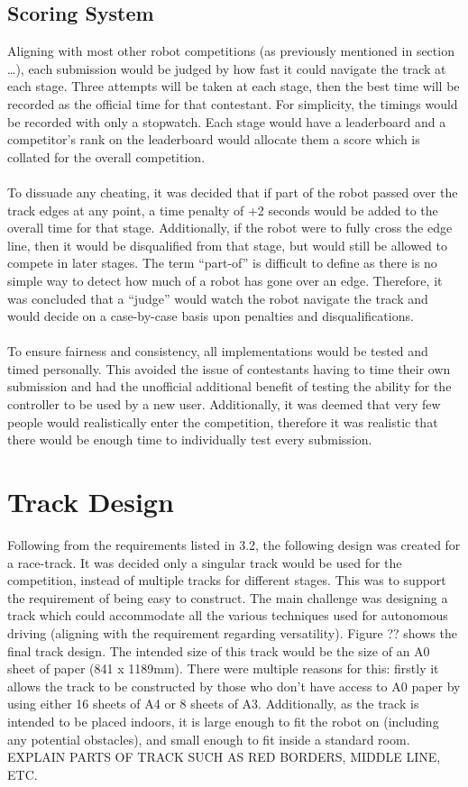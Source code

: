\documentclass{l4proj}
\begin{document}
\subsection{Scoring System}
Aligning with most other robot competitions (as previously mentioned in section …), each submission would be judged by how fast it could navigate the track at each stage. Three attempts will be taken at each stage, then the best time will be recorded as the official time for that contestant. For simplicity, the timings would be recorded with only a stopwatch. Each stage would have a leaderboard and a competitor's rank on the leaderboard would allocate them a score which is collated for the overall competition.
\\\\
To dissuade any cheating, it was decided that if part of the robot passed over the track edges at any point, a time penalty of +2 seconds would be added to the overall time for that stage. Additionally, if the robot were to fully cross the edge line, then it would be disqualified from that stage, but would still be allowed to compete in later stages. The term “part-of” is difficult to define as there is no simple way to detect how much of a robot has gone over an edge. Therefore, it was concluded that a “judge” would watch the robot navigate the track and would decide on a case-by-case basis upon penalties and disqualifications.
\\\\
To ensure fairness and consistency, all implementations would be tested and timed personally. This avoided the issue of contestants having to time their own submission and had the unofficial additional benefit of testing the ability for the controller to be used by a new user. Additionally, it was deemed that very few people would realistically enter the competition, therefore it was realistic that there would be enough time to individually test every submission.

\section{Track Design}
Following from the requirements listed in 3.2, the following design was created for a race-track. It was decided only a singular track would be used for the competition, instead of multiple tracks for different stages. This was to support the requirement of being easy to construct. The main challenge was designing a track which could accommodate all the various techniques used for autonomous driving (aligning with the requirement regarding versatility). Figure ?? shows the final track design. The intended size of this track would be the size of an A0 sheet of paper (841 x 1189mm). There were multiple reasons for this: firstly it allows the track to be constructed by those who don’t have access to A0 paper by using either 16 sheets of A4 or 8 sheets of A3. Additionally, as the track is intended to be placed indoors, it is large enough to fit the robot on (including any potential obstacles), and small enough to fit inside a standard room.
\\
EXPLAIN PARTS OF TRACK SUCH AS RED BORDERS, MIDDLE LINE, ETC.
\end{document}
